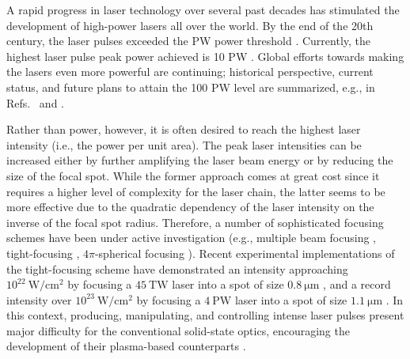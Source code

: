 \documentclass[10pt, a4paper, twoside, openright]{report}
\begin{document}

A rapid progress in laser technology over several past decades has stimulated the development of high-power lasers all over the world. By the end of the 20th century, the laser pulses exceeded the PW power threshold \cite{Perry1999}. Currently, the highest laser pulse peak power achieved is 10 PW \cite{Tanaka2020}. Global efforts towards making the lasers even more powerful are continuing; historical perspective, current status, and future plans to attain the 100 PW level are summarized, e.g., in Refs.~ and .

Rather than power, however, it is often desired to reach the highest laser intensity (i.e., the power per unit area). The peak laser intensities can be increased either by further amplifying the laser beam energy or by reducing the size of the focal spot. While the former approach comes at great cost since it requires a higher level of complexity for the laser chain, the latter seems to be more effective due to the quadratic dependency of the laser intensity on the inverse of the focal spot radius. Therefore, a number of sophisticated focusing schemes have been under active investigation (e.g., multiple beam focusing \cite{Bulanov2010}, tight-focusing \cite{Bahk2004, Jeong2015}, $ 4 \pi $-spherical focusing \cite{Gonoskov2012, Jeong2020}). Recent experimental implementations of the tight-focusing scheme have demonstrated an intensity approaching $ 10^{22} \ \mathrm{W / cm^{2}} $ by focusing a $ 45 \ \mathrm{TW} $ laser into a spot of size $ 0.8 \ \mathrm{\mu m} $ \cite{Bahk2004}, and a record intensity over $ 10^{23} \ \mathrm{W / cm^{2}} $ by focusing a $ 4 \ \mathrm{PW} $ laser into a spot of size $ 1.1 \ \mathrm{\mu m} $ \cite{Yoon2021}. In this context, producing, manipulating, and controlling intense laser pulses present major difficulty for the conventional solid-state optics, encouraging the development of their plasma-based counterparts \cite{Thaury2007, Nakatsutsumi2010, Tamburini2014, Peng2019}.
\end{document}
